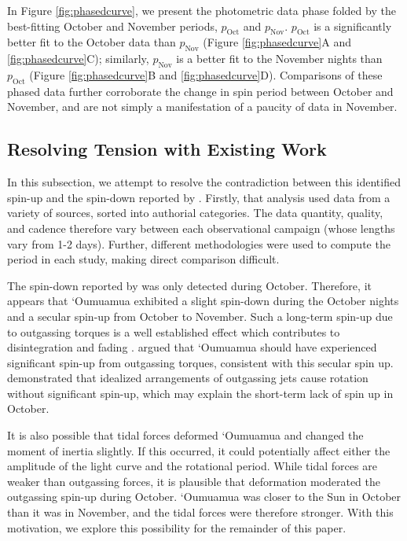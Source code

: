 \documentclass[twocolumn,doublespacing]{aastex631}
\begin{document}
In Figure \ref{fig:phasedcurve}, we present the photometric data phase folded by the best-fitting October and November periods, $p_\text{Oct}$ and $p_\text{Nov}$. $p_\text{Oct}$ is a significantly better fit to the October data than $p_\text{Nov}$ (Figure \ref{fig:phasedcurve}A and \ref{fig:phasedcurve}C); similarly, $p_\text{Nov}$ is a better fit to the November nights than $p_\text{Oct}$ (Figure \ref{fig:phasedcurve}B and \ref{fig:phasedcurve}D). Comparisons of these phased data further corroborate the change in spin period between October and November, and are not simply a manifestation of a paucity of data in November.

\subsection{Resolving Tension with Existing Work}\label{sec:flekkoyana}

In this subsection, we attempt to resolve the contradiction between this identified spin-up and the spin-down reported by \citet{flekkoy2019}. Firstly, that analysis used data from a variety of sources, sorted into authorial categories. The data quantity, quality, and cadence therefore vary between each observational campaign (whose lengths vary from 1-2 days). Further, different methodologies were used to compute the period in each study, making direct comparison difficult. 

The spin-down reported by \citet{flekkoy2019} was only detected during October. Therefore, it appears that `Oumuamua exhibited a slight spin-down during the October nights and a secular spin-up from October to November. Such a long-term spin-up due to outgassing torques is a well established effect \citep{Kokotanekova2018,Jewitt2021} which contributes to disintegration \citep{Jewitt2022} and fading \citep{brasser2015}. \citet{rafikov2018b} argued that `Oumuamua should have experienced significant spin-up from outgassing torques, consistent with this secular spin up. \citet{SLB2019} demonstrated that idealized arrangements of outgassing jets cause rotation without significant spin-up, which may explain the short-term lack of spin up in October.

It is also possible that tidal forces deformed `Oumuamua and changed the moment of inertia slightly. If this occurred, it could potentially affect either the amplitude of the light curve and the rotational period. While tidal forces are weaker than outgassing forces, it is plausible that deformation moderated the outgassing spin-up during October. `Oumuamua was closer to the Sun in October than it was in November, and the tidal forces were therefore stronger. With this motivation, we explore this possibility for the remainder of this paper.
\end{document}
